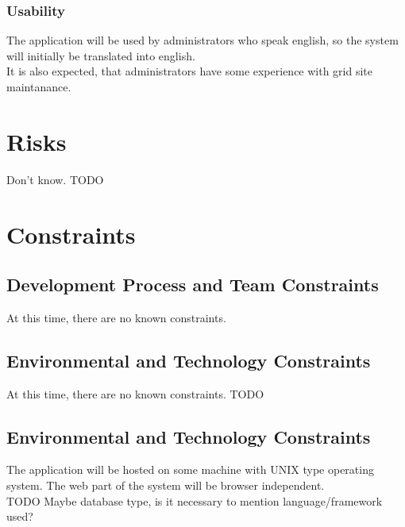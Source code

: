 \documentclass[12pt]{article}
\begin{document}
\subsubsection{Usability}
The application will be used by administrators who speak english, so the system will initially be translated into english.\\
It is also expected, that administrators have some experience with grid site maintanance.


\section{Risks}
Don't know. TODO


\section{Constraints}

\subsection{Development Process and Team Constraints}
At this time, there are no known constraints.

\subsection{Environmental and Technology Constraints}
At this time, there are no known constraints. TODO

\subsection{Environmental and Technology Constraints}
The application will be hosted on some machine with UNIX type operating system. The web part of the system will be browser independent.\\
TODO Maybe database type, is it necessary to mention language/framework used?
\end{document}
